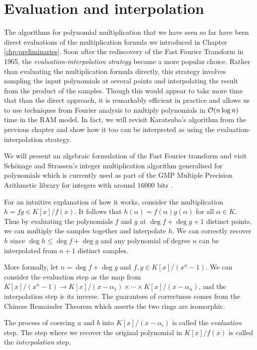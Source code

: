 \chapter{Evaluation and interpolation}\label{chp:eval-interp}

The algorithms for polynomial multiplication that we have seen so far have been direct evaluations of the multiplication formula we introduced in Chapter \ref{chp:preliminaries}. Soon after the rediscovery of the Fast Fourier Transform in 1965, the \textit{evaluation-interpolation strategy} became a more popular choice. Rather than evaluating the multiplication formula directly, this strategy involves sampling the input polynomials at several points and interpolating the result from the product of the samples. Though this would appear to take more time that than the direct approach, it is remarkably efficient in practice and allows us to use techniques from Fourier analysis to multiply polynomials in $\mathcal O(n \log n)$ time in the RAM model. In fact, we will revisit Karatsuba's algorithm from the previous chapter and show how it too can be interpreted as using the evaluation-interpolation strategy.

We will present an algebraic formulation of the Fast Fourier transform and visit Sch\"{o}nage and Strassen's integer multiplication algorithm generalised for polynomials which is currently used as part of the GMP Multiple Precision Arithmetic library for integers with around $16000$ bits \cite{gmp-big-num}.

For an intuitive explanation of how it works, consider the multiplication $h = fg \in K[x] / f(x)$. It follows that $h(\alpha) = f(\alpha)g(\alpha)$ for all $\alpha \in K$. Thus by evaluating the polynomials $f$ and $g$ at $\deg f + \deg g + 1$ distinct points, we can multiply the samples together and interpolate $h$. We can correctly recover $h$ since $\deg h \le \deg f + \deg g$ and any polynomial of degree $n$ can be interpolated from $n + 1$ distinct samples.

More formally, let $n = \deg f + \deg g$ and $f, g \in K[x]/(x^n - 1)$. We can consider the evaluation step as the map from $K[x]/(x^n - 1) \to K[x]/(x - \alpha_1) \times \cdots \times K[x]/(x - \alpha_n)$, and the interpolation step is its inverse. The guarantees of correctness comes from the Chinese Remainder Theorem which asserts the two rings are isomorphic.

The process of coercing $a$ and $b$ into $K[x]/ (x - \alpha_i)$ is called the \emph{evaluation} step. The step where we recover the original polynomial in $K[x]/f(x)$ is called the \emph{interpolation} step.

